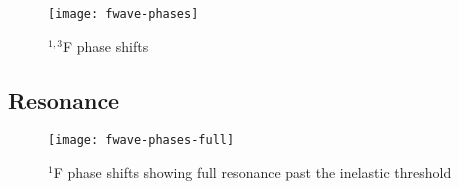 \documentclass[Dissertation.tex]{subfiles}
\begin{document}
%

\begin{figure}
	\centering
	\texttt{[image: fwave-phases]}
	\caption{$^{1,3}$F phase shifts}
	\label{fig:FWavePhase}
\end{figure}


\subsection{Resonance}
\label{sec:FWaveResonance}

\begin{figure}
	\centering
	\texttt{[image: fwave-phases-full]}
	\caption[Full $^1$F phase shifts]{$^1$F phase shifts showing full resonance past the inelastic threshold}
	\label{fig:FWavePhaseFull}
\end{figure}
\end{document}
